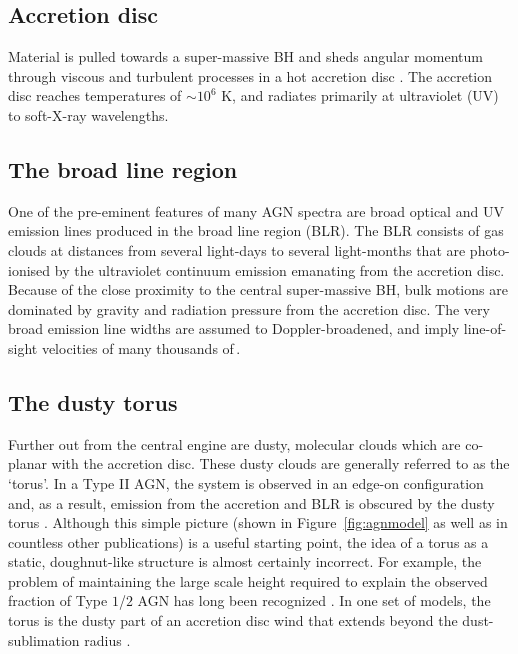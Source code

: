 \subsection{Accretion disc}

Material is pulled towards a super-massive BH and sheds angular momentum through viscous and turbulent processes in a hot accretion disc \citep[e.g.][]{begelman85}. 
The accretion disc reaches temperatures of $\sim10^6$ K, and radiates primarily at ultraviolet (UV) to soft-X-ray wavelengths. 

\subsection{The broad line region}

One of the pre-eminent features of many AGN spectra are broad optical and UV emission lines produced in the broad line region (BLR). 
The BLR consists of gas clouds at distances from several light-days to several light-months that are photo-ionised by the ultraviolet continuum emission emanating from the accretion disc.  
Because of the close proximity to the central super-massive BH, bulk motions are dominated by gravity and radiation pressure from the accretion disc.
The very broad emission line widths are assumed to Doppler-broadened, and imply line-of-sight velocities of many thousands of\,\kms. 

\subsection{The dusty torus}

Further out from the central engine are dusty, molecular clouds which are co-planar with the accretion disc. 
These dusty clouds are generally referred to as the `torus'. 
In a Type II AGN, the system is observed in an edge-on configuration and, as a result, emission from the accretion and BLR is obscured by the dusty torus \citep[e.g.][]{antonucci93}.
Although this simple picture (shown in Figure~\ref{fig:agnmodel} as well as in countless other publications) is a useful starting point, the idea of a torus as a static, doughnut-like structure is almost certainly incorrect. 
For example, the problem of maintaining the large scale height required to explain the observed fraction of Type $1$/$2$ AGN has long been recognized \citep[e.g.][]{krolik88}. 
In one set of models, the torus is the dusty part of an accretion disc wind that extends beyond the dust-sublimation radius \citep[e.g.][]{konigl94,everett09,gallagher12,everett05,keating12,elitzur06}. 

